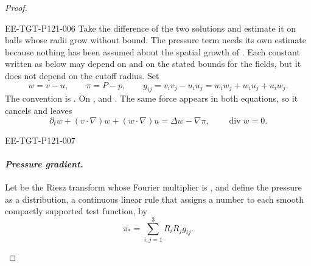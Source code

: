 \begin{proof}
\begin{EESegment}{EE-TGT-P121-006}
Take the difference of the two solutions and estimate it on balls whose radii grow without
bound. The pressure term needs its own estimate because nothing has been assumed about the
spatial growth of . Each constant written as
 below may depend on  and on the
stated bounds for the fields, but it does not depend on the cutoff radius. Set
\[
  w=v-u,\qquad
  \pi=P-p,\qquad
  g_{ij}=v_iv_j-u_iu_j=w_iw_j+w_iu_j+u_iw_j.
\]
The convention is
.
On ,
 and
.
The same force appears in both equations, so it cancels and leaves
\begin{equation}
  \partial_t w+(v\cdot\nabla)w+(w\cdot\nabla)u
  =\Delta w-\nabla\pi,\qquad \operatorname{div}w=0.
\tag{10.15}\label{eq:10.15}
\end{equation}
\end{EESegment}

\begin{EESegment}{EE-TGT-P121-007}
\paragraph{\normalfont\itshape Pressure gradient.}
Let  be the Riesz transform whose Fourier multiplier is
, and define the pressure as a distribution, a continuous linear
rule that assigns a number to each smooth compactly supported test function, by
\begin{equation}
  \pi_*=\sum_{i,j=1}^3 R_iR_jg_{ij}.
\tag{10.16}\label{eq:10.16}
\end{equation}
\end{EESegment}


\end{proof}
